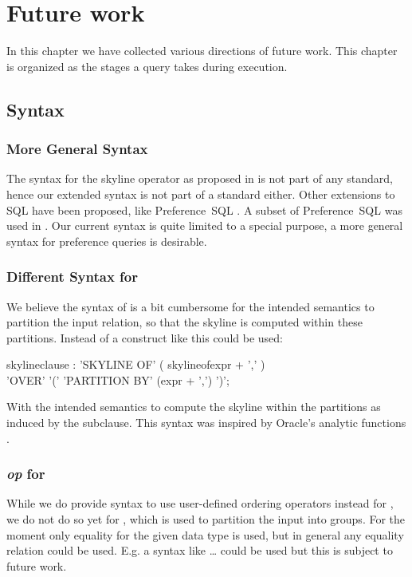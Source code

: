 


\chapter{Future work}
\label{chap:future-work}
In this chapter we have collected various directions of future work.
This chapter is organized as the stages a query takes during
execution.

\section{Syntax}
\subsection{More General Syntax}
The syntax for the skyline operator as proposed
in \citep{Borzsonyi2001} is not part of any standard, hence our
extended syntax is not part of a standard either.  Other extensions to
SQL have been proposed, like Preference~SQL \citep{Kiessling2002a}.  A
subset of Preference~SQL was used in \citep{Chaudhuri2006}.  Our
current syntax is quite limited to a special purpose, a more general
syntax for preference queries is desirable.

\subsection{Different Syntax for }
We believe the syntax of  is a bit
cumbersome for the intended semantics to partition the input relation,
so that the skyline is computed within these partitions. Instead
of  a construct like this could be used:

\begin{rail}
skylineclause : 
    'SKYLINE OF' ( skylineofexpr + ',' ) \\ 'OVER' '(' 'PARTITION BY' (expr + ',') ')';
\end{rail}

\noindent
With the intended semantics to compute the skyline within the
partitions as induced by the  subclause. This
syntax was inspired by Oracle's analytic functions \citep[Page~5-10]{Oracle2005}.


\subsection{ \emph{op} for }
While we do provide syntax to use user-defined ordering operators
instead for , we do not do so yet for
, which is used to partition the input
into groups.  For the moment only equality for the given data type is
used, but in general any equality relation could be used.  E.g. a 
syntax like \dots {} could be used
but this is subject to future work.


